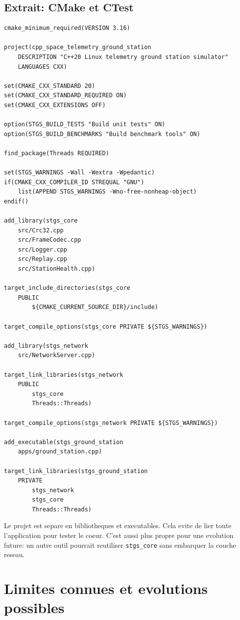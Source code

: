 \documentclass[10pt,a4paper]{article}
\begin{document}
\subsection{Extrait: CMake et CTest}
\begin{lstlisting}[caption={Structure CMake: libraries, executables, tests, benchmarks}]
cmake_minimum_required(VERSION 3.16)

project(cpp_space_telemetry_ground_station
    DESCRIPTION "C++20 Linux telemetry ground station simulator"
    LANGUAGES CXX)

set(CMAKE_CXX_STANDARD 20)
set(CMAKE_CXX_STANDARD_REQUIRED ON)
set(CMAKE_CXX_EXTENSIONS OFF)

option(STGS_BUILD_TESTS "Build unit tests" ON)
option(STGS_BUILD_BENCHMARKS "Build benchmark tools" ON)

find_package(Threads REQUIRED)

set(STGS_WARNINGS -Wall -Wextra -Wpedantic)
if(CMAKE_CXX_COMPILER_ID STREQUAL "GNU")
    list(APPEND STGS_WARNINGS -Wno-free-nonheap-object)
endif()

add_library(stgs_core
    src/Crc32.cpp
    src/FrameCodec.cpp
    src/Logger.cpp
    src/Replay.cpp
    src/StationHealth.cpp)

target_include_directories(stgs_core
    PUBLIC
        ${CMAKE_CURRENT_SOURCE_DIR}/include)

target_compile_options(stgs_core PRIVATE ${STGS_WARNINGS})

add_library(stgs_network
    src/NetworkServer.cpp)

target_link_libraries(stgs_network
    PUBLIC
        stgs_core
        Threads::Threads)

target_compile_options(stgs_network PRIVATE ${STGS_WARNINGS})

add_executable(stgs_ground_station
    apps/ground_station.cpp)

target_link_libraries(stgs_ground_station
    PRIVATE
        stgs_network
        stgs_core
        Threads::Threads)
\end{lstlisting}


Le projet est separe en bibliotheques et executables. Cela evite de lier toute l'application pour tester le coeur. C'est aussi plus propre pour une evolution future: un autre outil pourrait reutiliser \texttt{stgs\_core} sans embarquer la couche reseau.

\section{Limites connues et evolutions possibles}
\end{document}
